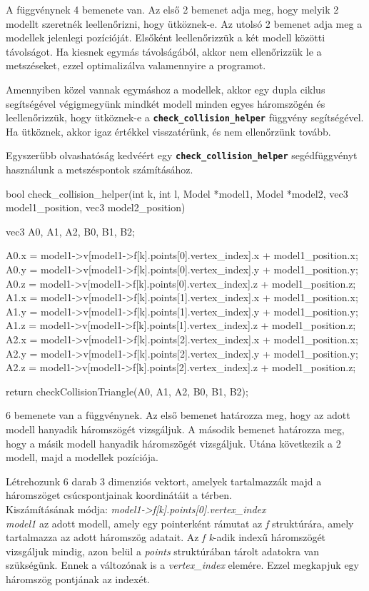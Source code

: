 A függvénynek 4 bemenete van. Az első 2 bemenet adja meg, hogy melyik 2 modellt szeretnék leellenőrizni, hogy ütköznek-e. Az utolsó 2 bemenet adja meg a modellek jelenlegi pozícióját.
Elsőként leellenőrizzük a két modell közötti távolságot. Ha kiesnek egymás távolságából, akkor nem ellenőrizzük le a metszéseket, ezzel optimalizálva valamennyire a programot. 

Amennyiben közel vannak egymáshoz a modellek, akkor egy dupla ciklus segítségével végigmegyünk mindkét modell minden egyes háromszögén és leellenőrizzük, hogy ütköznek-e a \textbf{\texttt{check\_collision\_helper}} függvény segítségével. Ha ütköznek, akkor igaz értékkel visszatérünk, és nem ellenőrzünk tovább.
\newpage

Egyszerűbb olvashatóság kedvéért egy \textbf{\texttt{check\_collision\_helper}} segédfüggvényt használunk a metszéspontok számításához.

\begin{cpp}
bool check_collision_helper(int k, int l, Model *model1, 
Model *model2, vec3 model1_position, vec3 model2_position)
{
    vec3 A0, A1, A2, B0, B1, B2;
		
    A0.x = model1->v[model1->f[k].points[0].vertex_index].x 
    + model1_position.x;
    A0.y = model1->v[model1->f[k].points[0].vertex_index].y 
    + model1_position.y;
    A0.z = model1->v[model1->f[k].points[0].vertex_index].z 
    + model1_position.z;
    A1.x = model1->v[model1->f[k].points[1].vertex_index].x 
    + model1_position.x;
    A1.y = model1->v[model1->f[k].points[1].vertex_index].y 
    + model1_position.y;
    A1.z = model1->v[model1->f[k].points[1].vertex_index].z 
    + model1_position.z;
    A2.x = model1->v[model1->f[k].points[2].vertex_index].x 
    + model1_position.x;
    A2.y = model1->v[model1->f[k].points[2].vertex_index].y 
    + model1_position.y;
    A2.z = model1->v[model1->f[k].points[2].vertex_index].z 
    + model1_position.z;

    return checkCollisionTriangle(A0, A1, A2, B0, B1, B2);
}
\end{cpp}


6 bemenete van a függvénynek. Az első bemenet határozza meg, hogy az adott modell hanyadik háromszögét vizsgáljuk. A második bemenet határozza meg, hogy a másik modell hanyadik háromszögét vizsgáljuk. Utána következik a 2 modell, majd a modellek pozíciója.

Létrehozunk 6 darab 3 dimenziós vektort, amelyek tartalmazzák majd a háromszöget csúcspontjainak koordinátáit a térben. \\
Kiszámításának módja: \textit{model1->f[k].points[0].vertex\_index} \\
\textit{model1} az adott modell, amely egy pointerként rámutat az \textit{f} struktúrára, amely tartalmazza az adott háromszög adatait. Az \textit{f k}-adik indexű háromszögét vizsgáljuk mindig, azon belül a \textit{points} struktúrában tárolt adatokra van szükségünk. Ennek a változónak is a \textit{vertex\_index} elemére. Ezzel megkapjuk egy háromszög pontjának az indexét.

